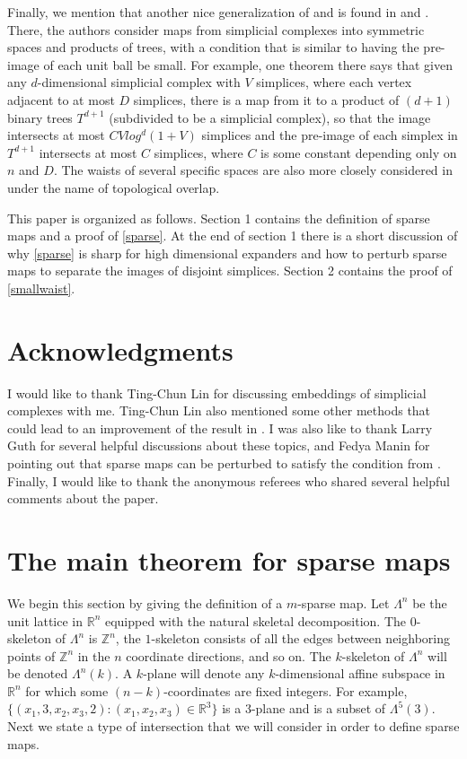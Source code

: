 \documentclass[12pt]{article}
\newcommand{\ZZ}{\mathbb{Z}}
\newcommand{\RR}{\mathbb{R}}
\begin{document}
	Finally, we mention that another nice generalization of \cite{KB} and \cite{GG} is found in \cite{BH} and \cite{H}. There, the authors consider maps from simplicial complexes into symmetric spaces and products of trees, with a condition that is similar to having the pre-image of each unit ball be small. For example, one theorem there says that given any $d$-dimensional simplicial complex with $V$ simplices, where each vertex adjacent to at most $D$ simplices, there is a map from it to a product of $(d+1)$ binary trees $T^{d+1}$ (subdivided to be a simplicial complex), so that the image intersects at most $CVlog^d(1+V)$ simplices and the pre-image of each simplex in $T^{d+1}$ intersects at most $C$ simplices, where $C$ is some constant depending only on $n$ and $D$. The waists of several specific spaces are also more closely considered in \cite{H} under the name of topological overlap.    
	
	\par This paper is organized as follows. Section 1 contains the definition of sparse maps and a proof of \cref{sparse}. At the end of section 1 there is a  short discussion of why \cref{sparse} is sharp for high dimensional expanders and how to perturb sparse maps to separate the images of disjoint simplices. Section 2 contains the proof of \cref{smallwaist}.
	
	\section*{\centering Acknowledgments}
	I would like to thank Ting-Chun Lin for discussing embeddings of simplicial complexes with me. Ting-Chun Lin also mentioned some other methods that could lead to an improvement of the result in \cite{GG}. I was also like to thank Larry Guth for several helpful discussions about these topics, and Fedya Manin for pointing out that sparse maps can be perturbed to satisfy the condition from \cite{GG}. Finally, I would like to thank the anonymous referees who shared several helpful comments about the paper.
	
	\section*{\centering The main theorem for sparse maps}
	
	We begin this section by giving the definition of a $m$-sparse map. Let $\Lambda^n$ be the unit lattice in $\RR^n$ equipped with the natural skeletal decomposition. The $0$-skeleton of $\Lambda^n$ is $\mathbb{Z}^n$, the $1$-skeleton consists of all the edges between neighboring points of $\ZZ^n$ in the $n$ coordinate directions, and so on. The $k$-skeleton of $\Lambda^n$ will be denoted $\Lambda^n(k)$. A $k$-plane will denote any $k$-dimensional affine subspace in $\RR^n$ for which some $(n-k)$-coordinates are fixed integers. For example, $\{(x_1, 3, x_2, x_3, 2): (x_1, x_2, x_3) \in \RR^3\}$ is a 3-plane and is a subset of $\Lambda^5(3)$. Next we state a type of intersection that we will consider in order to define sparse maps.
	
\end{document}
